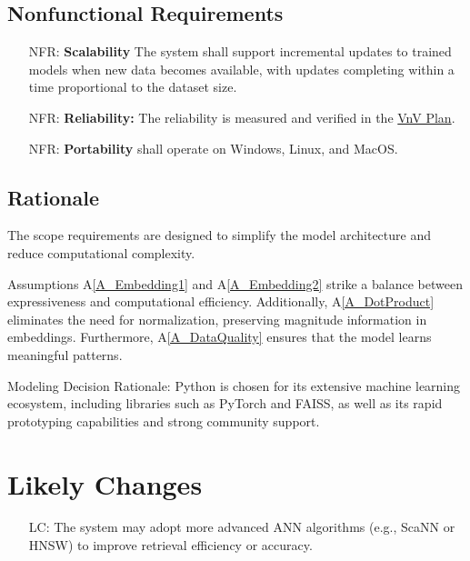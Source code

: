 \documentclass[12pt]{article}
\newcommand{\aref}[1]{A\ref{#1}}
\newcounter{nfrnum} %
\newcounter{lcnum} %
\begin{document}
\subsection{Nonfunctional Requirements}

\noindent \begin{itemize}

\item[NFR\refstepcounter{nfrnum}\thenfrnum \label{NFR_Scalability}:]
  \textbf{Scalability} The system shall support incremental updates to trained models when new data becomes available, with updates completing within a time proportional to the dataset size.

\item[NFR\refstepcounter{nfrnum}\thenfrnum \label{NFR_Reliability:}:]
  \textbf{Reliability:} The reliability is measured and verified in the \href{https://github.com/V-AS/Two-tower-recommender-system/blob/main/docs/VnVPlan/VnVPlan.pdf}{VnV Plan}.

\item[NFR\refstepcounter{nfrnum}\thenfrnum \label{NFR_Portability}:]
  \textbf{Portability} \progname{} shall operate on Windows, Linux, and MacOS.

\end{itemize}

\subsection{Rationale}

The scope requirements are designed to simplify the model architecture and reduce computational complexity.

Assumptions \aref{A_Embedding1} and \aref{A_Embedding2} strike a balance between expressiveness and computational efficiency. Additionally, \aref{A_DotProduct} eliminates the need for normalization, preserving magnitude information in embeddings. Furthermore, \aref{A_DataQuality} ensures that the model learns meaningful patterns.

Modeling Decision Rationale: 
Python is chosen for its extensive machine learning ecosystem, including libraries such as PyTorch and FAISS, as well as its rapid prototyping capabilities and strong community support.

\section{Likely Changes}    

\noindent \begin{itemize}

\item[LC\refstepcounter{lcnum}\thelcnum\label{LC_advancedANN}:] The system may adopt more advanced ANN algorithms (e.g., ScaNN or HNSW) to improve retrieval efficiency or accuracy.

\end{itemize}
\end{document}
